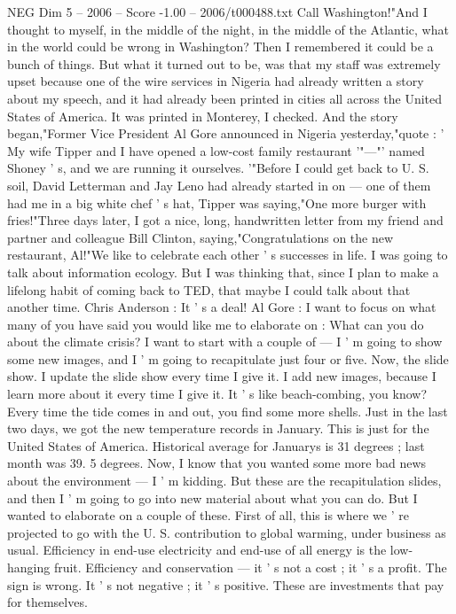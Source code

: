 \begin{textsample}{NEG Dim 5 – 2006 – Score -1.00 – 2006/t000488.txt}
Call Washington!"And I thought to myself, in the middle of the night, in the middle of the Atlantic, what in the world could be wrong in Washington?
Then I remembered it could be a bunch of things.
But what it turned out to be, was that my staff was extremely upset because one of the wire services in Nigeria had already written a story about my speech, and it had already been printed in cities all across the United States of America.
It was printed in Monterey, I checked.
And the story began,"Former Vice President Al Gore announced in Nigeria yesterday,"quote : ' My wife Tipper and I have opened a low-cost family restaurant '"—"' named Shoney ' s, and we are running it ourselves. '"Before I could get back to U.
S. soil, David Letterman and Jay Leno had already started in on — one of them had me in a big white chef ' s hat, Tipper was saying,"One more burger with fries!"Three days later, I got a nice, long, handwritten letter from my friend and partner and colleague Bill Clinton, saying,"Congratulations on the new restaurant, Al!"We like to celebrate each other ' s successes in life.
I was going to talk about information ecology.
But I was thinking that, since I plan to make a lifelong habit of coming back to TED, that maybe I could talk about that another time.
Chris Anderson : It ' s a deal!
Al Gore : I want to focus on what many of you have said you would like me to elaborate on : What can you do about the climate crisis?
I want to start with a couple of — I ' m going to show some new images, and I ' m going to recapitulate just four or five.
Now, the slide show.
I update the slide show every time I give it.
I add new images, because I learn more about it every time I give it.
It ' s like beach-combing, you know?
Every time the tide comes in and out, you find some more shells.
Just in the last two days, we got the new temperature records in January.
This is just for the United States of America.
Historical average for Januarys is 31 degrees ; last month was 39. 5 degrees.
Now, I know that you wanted some more bad news about the environment — I ' m kidding.
But these are the recapitulation slides, and then I ' m going to go into new material about what you can do.
But I wanted to elaborate on a couple of these.
First of all, this is where we ' re projected to go with the U.
S. contribution to global warming, under business as usual.
Efficiency in end-use electricity and end-use of all energy is the low-hanging fruit.
Efficiency and conservation — it ' s not a cost ; it ' s a profit.
The sign is wrong.
It ' s not negative ; it ' s positive.
These are investments that pay for themselves.

\end{textsample}
